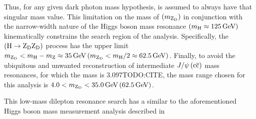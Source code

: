Thus, for any given dark photon mass hypothesis, \PZD is assumed to always have that singular mass value.
This limitation on the mass of \PZD $\left(m_{\mathrm{Z}_\text{D}}\right)$ in conjunction with the narrow-width nature of the Higgs boson mass resonance $\left( m_{\mathrm{H}} \approx 125\,\text{Ge\hspace{-.08em}V} \right)$ kinematically constrains the search region of the analysis.
Specifically, the \htozzd $\left(\mathrm{H} \to \mathrm{Z}_\text{D}\mathrm{Z}_\text{D}\right)$ process has the upper limit
$m_{\mathrm{Z}_\text{D}} < m_{\mathrm{H}} - m_{\mathrm{Z}} \approx 35\,\text{Ge\hspace{-.08em}V}    \left(m_{\mathrm{Z}_\text{D}} < m_{\mathrm{H}} / 2 \approx 62.5\,\text{Ge\hspace{-.08em}V}\right)$.
Finally, to avoid the ubiquitous and unwanted reconstruction of intermediate $J / \psi \left(\mathrm{c}\overline{\mathrm{c}}\right)$ mass resonances, for which the mass is 3.097\GeV TODO:CITE,
the mass range chosen for this analysis is $4.0 < m_{\mathrm{Z}_\text{D}} < 35.0\,\text{Ge\hspace{-.08em}V} \left(62.5\,\text{Ge\hspace{-.08em}V}\right)$.

This low-mass dilepton resonance search has a similar  to the aforementioned Higgs boson mass measurement analysis described in 